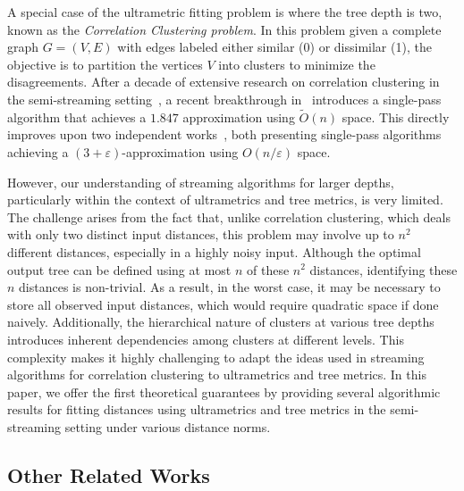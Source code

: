 \documentclass{article}
\begin{document}
A special case of the ultrametric fitting problem is where the tree depth is two, known as the \emph{Correlation Clustering problem}. 
In this problem given a complete graph $G=(V, E)$ with edges labeled either similar (0) or dissimilar (1), the objective is to partition the vertices $V$ into clusters to minimize the disagreements. 
After a decade of extensive research on correlation clustering in the semi-streaming setting~\cite{ChierichettiDK14, ahn2021correlation, cohen2021correlation, Assadi022, BehnezhadCMT22, Cohen-AddadLMP22, BehnezhadCMT23, Cohen-AddadLPTY24},
a recent breakthrough in~\cite{Cohen-AddadLPTY24} introduces
a single-pass algorithm that achieves a $ 1.847$ approximation using \(\tilde{O}(n)\) space.
This directly improves upon two independent works~\cite{CambusKLPU24, chakrabarty2023single}, both presenting single-pass algorithms achieving a $(3+\varepsilon)$-approximation using \(O(n/\varepsilon)\) space.
 
However, our understanding of streaming algorithms for larger depths, particularly within the context of ultrametrics and tree metrics, is very limited.
The challenge arises from the fact that, unlike correlation clustering, which deals with only two distinct input distances, this problem may involve up to \(n^2\) different distances, especially in a highly noisy input.
Although the optimal output tree can be defined using at most $n$ of these $n^2$ distances, identifying these $n$ distances is non-trivial. As a result, in the worst case, it may be necessary to store all observed input distances, which would require quadratic space if done naively.
Additionally, the hierarchical nature of clusters at various tree depths introduces inherent dependencies among clusters at different levels. This complexity makes it highly challenging to adapt the ideas used in streaming algorithms for correlation clustering to ultrametrics and tree metrics.
In this paper, we offer the first theoretical guarantees by providing several algorithmic results for fitting distances using ultrametrics and tree metrics in the semi-streaming setting under various distance norms.

\subsection{Other Related Works}\label{section:otherrealted}
\end{document}
